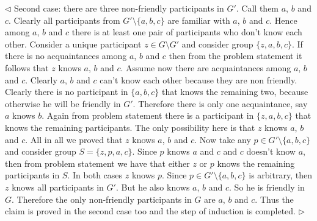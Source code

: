 \documentclass[12pt]{article}
\newenvironment{solution}{\par $\triangleleft$}{$\triangleright$}
\begin{document}
\begin{solution}
    Second case: there are three non-friendly participants in $G'$. Call them
    $a$, $b$ and $c$. Clearly all participants from $G'\setminus \{a,b,c\}$ are
    familiar with $a$, $b$ and $c$. Hence among $a$, $b$ and $c$ there is at
    least one pair of participants who don't know each other. Consider a unique
    participant $z\in G\setminus G'$ and consider group $\{z,a,b,c\}$. If there
    is no acquaintances among $a$, $b$ and $c$ then from the problem statement
    it follows that $z$ knows $a$, $b$ and $c$. Assume now there are
    acquaintances among $a$, $b$ and $c$. Clearly $a$, $b$ and $c$ can't know
    each other because they are non friendly. Clearly there is no participant in
    $\{a,b,c\}$ that knows the remaining two, because otherwise he will be
    friendly in $G'$. Therefore there is only one acquaintance, say $a$ knows
    $b$. Again from problem statement there is a participant in $\{z,a,b,c\}$
    that knows the remaining participants. The only possibility here is that $z$
    knows $a$, $b$ and $c$. All in all we proved that $z$ knows $a$, $b$ and
    $c$. Now take any $p\in G'\setminus \{a,b,c\}$ and consider group
    $S=\{z,p,a,c\}$. Since $p$ knows $a$ and $c$ and $c$ doesn't know $a$, then
    from problem statement we have that either $z$ or $p$ knows the remaining
    participants in $S$. In both cases $z$ knows $p$. Since $p\in G'\setminus
        \{a,b,c\}$ is arbitrary, then $z$ knows all participants in $G'$. But he
    also knows $a$, $b$ and $c$. So he is friendly in $G$. Therefore the only
    non-friendly participants in $G$ are $a$, $b$ and $c$. Thus the claim is
    proved in the second case too and the step of induction is completed.
\end{solution}
\end{document}
